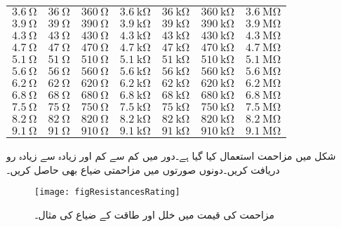 \begin{table}
\begin{tabular}{l l l l l l l}
$\SI{3.6}{\ohm} $& $\SI{36}{\ohm}$ & $\SI{360}{\ohm}$ & $\SI{3.6}{\kilo\ohm}$ &$\SI{36}{\kilo\ohm} $& $\SI{360}{\kilo\ohm}$ & $\SI{3.6}{\mega\ohm}$\\
$\SI{3.9}{\ohm} $& $\SI{39}{\ohm}$ & $\SI{390}{\ohm}$ & $\SI{3.9}{\kilo\ohm}$ &$\SI{39}{\kilo\ohm} $& $\SI{390}{\kilo\ohm}$ & $\SI{3.9}{\mega\ohm}$\\
$\SI{4.3}{\ohm} $& $\SI{43}{\ohm}$ & $\SI{430}{\ohm}$ & $\SI{4.3}{\kilo\ohm}$ &$\SI{43}{\kilo\ohm} $& $\SI{430}{\kilo\ohm}$ & $\SI{4.3}{\mega\ohm}$\\
$\SI{4.7}{\ohm} $& $\SI{47}{\ohm}$ & $\SI{470}{\ohm}$ & $\SI{4.7}{\kilo\ohm}$ &$\SI{47}{\kilo\ohm} $& $\SI{470}{\kilo\ohm}$ & $\SI{4.7}{\mega\ohm}$\\
$\SI{5.1}{\ohm} $& $\SI{51}{\ohm}$ & $\SI{510}{\ohm}$ & $\SI{5.1}{\kilo\ohm}$ &$\SI{51}{\kilo\ohm} $& $\SI{510}{\kilo\ohm}$ & $\SI{5.1}{\mega\ohm}$\\
$\SI{5.6}{\ohm} $& $\SI{56}{\ohm}$ & $\SI{560}{\ohm}$ & $\SI{5.6}{\kilo\ohm}$ &$\SI{56}{\kilo\ohm} $& $\SI{560}{\kilo\ohm}$ & $\SI{5.6}{\mega\ohm}$\\
$\SI{6.2}{\ohm} $& $\SI{62}{\ohm}$ & $\SI{620}{\ohm}$ & $\SI{6.2}{\kilo\ohm}$ &$\SI{62}{\kilo\ohm} $& $\SI{620}{\kilo\ohm}$ & $\SI{6.2}{\mega\ohm}$\\
$\SI{6.8}{\ohm} $& $\SI{68}{\ohm}$ & $\SI{680}{\ohm}$ & $\SI{6.8}{\kilo\ohm}$ &$\SI{68}{\kilo\ohm} $& $\SI{680}{\kilo\ohm}$ & $\SI{6.8}{\mega\ohm}$\\
$\SI{7.5}{\ohm} $& $\SI{75}{\ohm}$ & $\SI{750}{\ohm}$ & $\SI{7.5}{\kilo\ohm}$ &$\SI{75}{\kilo\ohm} $& $\SI{750}{\kilo\ohm}$ & $\SI{7.5}{\mega\ohm}$\\
$\SI{8.2}{\ohm} $& $\SI{82}{\ohm}$ & $\SI{820}{\ohm}$ & $\SI{8.2}{\kilo\ohm}$ &$\SI{82}{\kilo\ohm} $& $\SI{820}{\kilo\ohm}$ & $\SI{8.2}{\mega\ohm}$\\
$\SI{9.1}{\ohm} $& $\SI{91}{\ohm}$ & $\SI{910}{\ohm}$ & $\SI{9.1}{\kilo\ohm}$ &$\SI{91}{\kilo\ohm} $& $\SI{910}{\kilo\ohm}$ & $\SI{9.1}{\mega\ohm}$
\end{tabular}
\label{جدول_مزاحمتی_معیاری_مزاحمت_قیمتیں}
\end{table}

\FloatBarrier
{}
شکل  میں  مزاحمت استعمال کیا گیا ہے۔دور میں کم سے کم اور زیادہ سے زیادہ رو دریافت کریں۔دونوں صورتوں میں مزاحمتی ضیاع بھی حاصل کریں۔
\begin{figure}
\centering
\texttt{[image: figResistancesRating]}
\caption{مزاحمت کی قیمت میں خلل اور طاقت کے ضیاع کی مثال۔}
\label{مثال_مزاحمتی_خلل_طاقتی_ضیاع}
\end{figure}

